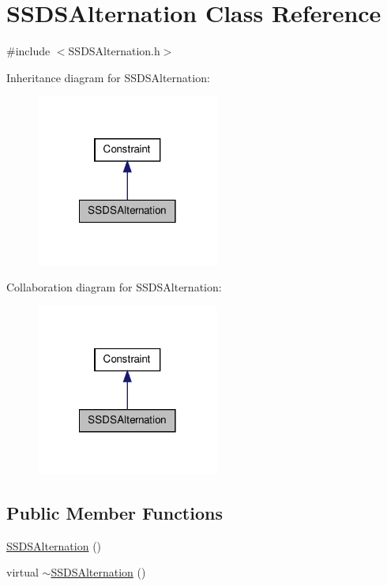 \hypertarget{classSSDSAlternation}{\section{\-S\-S\-D\-S\-Alternation \-Class \-Reference}
\label{classSSDSAlternation}
}


{\ttfamily \#include $<$\-S\-S\-D\-S\-Alternation.\-h$>$}



\-Inheritance diagram for \-S\-S\-D\-S\-Alternation\-:\nopagebreak
\begin{figure}[H]
\begin{center}
\leavevmode
\includegraphics[width=170pt]{classSSDSAlternation__inherit__graph}
\end{center}
\end{figure}


\-Collaboration diagram for \-S\-S\-D\-S\-Alternation\-:\nopagebreak
\begin{figure}[H]
\begin{center}
\leavevmode
\includegraphics[width=170pt]{classSSDSAlternation__coll__graph}
\end{center}
\end{figure}
\subsection*{\-Public \-Member \-Functions}
\begin{DoxyCompactItemize}
\item 
\hyperlink{classSSDSAlternation_a4f163d6400aac19c61c47d7ce0bdd7fd}{\-S\-S\-D\-S\-Alternation} ()
\item 
virtual \hyperlink{classSSDSAlternation_ac5a0ff4ee8a18bb6ebaaa436a4a901ee}{$\sim$\-S\-S\-D\-S\-Alternation} ()
\end{DoxyCompactItemize}
